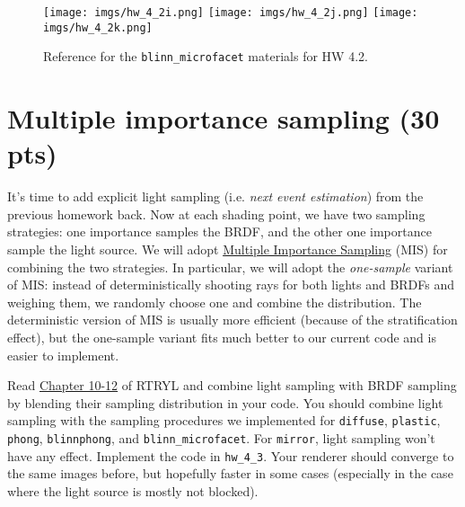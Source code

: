 \begin{figure}[ht]
    \centering
    \texttt{[image: imgs/hw\_4\_2i.png]}
    \texttt{[image: imgs/hw\_4\_2j.png]}
    \texttt{[image: imgs/hw\_4\_2k.png]}
    \caption{Reference for the \lstinline{blinn_microfacet} materials for HW 4.2.}
    \label{fig:hw_4_2_blinn_microfacet}
\end{figure}

\section{Multiple importance sampling (30 pts)}
It's time to add explicit light sampling (i.e. \emph{next event estimation}) from the previous homework back. Now at each shading point, we have two sampling strategies: one importance samples the BRDF, and the other one importance sample the light source. We will adopt \href{https://cseweb.ucsd.edu/~viscomp/classes/cse168/sp21/readings/veach.pdf}{Multiple Importance Sampling} (MIS) for combining the two strategies. In particular, we will adopt the \emph{one-sample} variant of MIS: instead of deterministically shooting rays for both lights and BRDFs and weighing them, we randomly choose one and combine the distribution. The deterministic version of MIS is usually more efficient (because of the stratification effect), but the one-sample variant fits much better to our current code and is easier to implement.

Read \href{https://raytracing.github.io/books/RayTracingTheRestOfYourLife.html#mixturedensities}{Chapter 10-12} of RTRYL and combine light sampling with BRDF sampling by blending their sampling distribution in your code. You should combine light sampling with the sampling procedures we implemented for \lstinline{diffuse}, \lstinline{plastic}, \lstinline{phong}, \lstinline{blinnphong}, and \lstinline{blinn_microfacet}. For \lstinline{mirror}, light sampling won't have any effect. Implement the code in \lstinline{hw_4_3}. Your renderer should converge to the same images before, but hopefully faster in some cases (especially in the case where the light source is mostly not blocked).

